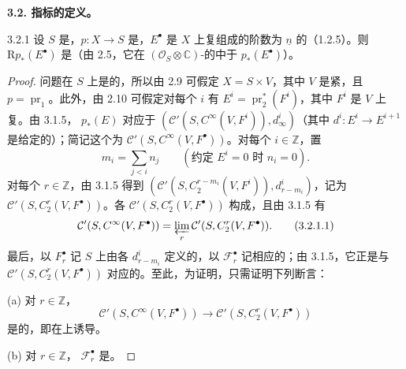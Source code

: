 \textbf{3.2. 指标的定义。}
\begin{SGAresult}{}{3.2.1}
设 $S$ 是，$p:X\to S$ 是，$E^\bullet$ 是 $X$ 上复组成的阶数为 $\underline n$ 的（1.2.5）。则 $\mathrm Rp_*(E^\bullet)$ 是（由 2.5，它在 $(\mathcal O_S\otimes\mathbb C)$-的中于 $p_*(E^\bullet)$）。
\end{SGAresult}
\begin{proof}
问题在 $S$ 上是的，所以由 2.9 可假定 $X=S\times V$，其中 $V$ 是紧，且 $p=\operatorname{pr}_1$。此外，由 2.10 可假定对每个 $i$ 有 $E^i=\operatorname{pr}_2^*(F^i)$，其中 $F^i$ 是 $V$ 上复。由 3.1.5， $p_*(E)$ 对应于 $(\mathcal C'(S,C^\infty(V,F^i)),d_\infty^i)$（其中 $d^i:E^i\to E^{i+1}$ 是给定的）；简记这个为 $\mathcal C'(S,C^\infty(V,F^\bullet))$。对每个 $i\in\mathbb Z$，置
\[m_i=\sum_{j<i}n_j\qquad(\text{约定 }E^i=0\text{ 时 }n_i=0).\]
对每个 $r\in\mathbb Z$，由 3.1.5 得到 $(\mathcal C'(S,C_2^{r-m_i}(V,F^i)),d^i_{r-m_i})$，记为 $\mathcal C'(S,C_2^r(V,F^\bullet))$。各 $\mathcal C'(S,C_2^r(V,F^\bullet))$ 构成，且由 3.1.5 有
\[\mathcal C'(S,C^\infty(V,F^\bullet))=\varprojlim_r\mathcal C'(S,C_2^r(V,F^\bullet)).\tag{3.2.1.1}\]
最后，以 $F_r^\bullet$ 记 $S$ 上由各 $d^i_{r-m_i}$ 定义的，以 $\mathcal F_r^\bullet$ 记相应的；由 3.1.5，它正是与 $\mathcal C'(S,C_2^r(V,F^\bullet))$ 对应的。至此，为证明，只需证明下列断言：

(a) 对 $r\in\mathbb Z$，
\[\mathcal C'(S,C^\infty(V,F^\bullet))\longrightarrow\mathcal C'(S,C_2^r(V,F^\bullet))\]
是的，即在上诱导。

(b) 对 $r\in\mathbb Z$， $\mathcal F_r^\bullet$ 是。


\end{proof}
